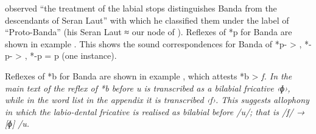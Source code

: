 \citet[133]{Collins1986} observed “the treatment of the labial
stops distinguishes Banda from the descendants of Seran Laut”
with which he classified them under the label of “Proto-Banda”
(his Seran Laut ≈ our  node of ).
Reflexes of *p for Banda are shown in example .
This shows the sound correspondences for Banda of *p- > {\0},
*-p- > {\0}, *-p = p (one instance).


Reflexes of *b for Banda are shown in example ,
which attests *b > \it{f}.
In the main text of \citet[131--134]{Collins1986} the reflex
of *b before \it{u} is transcribed as a bilabial fricative ‹ɸ›,
while in the word list in the appendix it is transcribed ‹f›.
This suggests allophony in which the labio-dental fricative is
realised as bilabial before /u/; that is /f/ → [ɸ] /{\gap}u.


